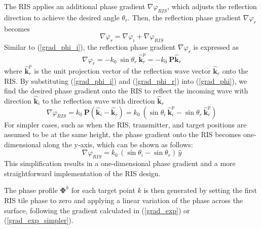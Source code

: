 \documentclass{IEEEoj}
\begin{document}
The RIS applies an additional phase gradient $\nabla \varphi_{RIS}$, which adjusts the reflection direction to achieve the desired angle $\theta_r$. Then, the reflection phase gradient $\nabla \varphi_r$ becomes
\begin{equation} \label{grad_phi}
	\nabla \varphi_r = \nabla \varphi_i + \nabla \varphi_{RIS}
\end{equation}
Similar to (\ref{grad_phi_i}), the reflection phase gradient $\nabla \varphi_r$ is expressed as
\begin{equation} \label{grad_phi_r}
	\nabla \varphi_r = - k_0 \ \sin\theta_r \ \mathbf{\hat{k}}_r^p = - k_0 \ \textbf{P} \mathbf{\hat{k}}_r
\end{equation}
where $\mathbf{\hat{k}}_r^p$ is the unit projection vector of the reflection wave vector \( \mathbf{\hat{k}}_r \) onto the RIS. By substituting (\ref{grad_phi_i}) and (\ref{grad_phi_r}) into (\ref{grad_phi}), we find the desired phase gradient onto the RIS to reflect the incoming wave with direction $\mathbf{\hat{k}}_i$ to the reflection wave with direction $\mathbf{\hat{k}}_r$
\begin{equation} \label{grad_exp}
	\nabla \varphi_{RIS} = k_0 \ \textbf{P} (\mathbf{\hat{k}}_i - \mathbf{\hat{k}}_r) = k_0 \ (\sin\theta_i \ \mathbf{\hat{k}}_i^p - \sin\theta_r \ \mathbf{\hat{k}}_r^p)
\end{equation}
For simpler cases, such as when the RIS, transmitter, and target positions are assumed to be at the same height, the phase gradient onto the RIS becomes one-dimensional along the y-axis, which can be shown as follows:
\begin{equation} \label{grad_exp_simpler}
	\nabla \varphi_{RIS} = k_0 \, (\sin\theta_i - \sin\theta_r) \, \hat{y}
\end{equation}
This simplification results in a one-dimensional phase gradient and a more straightforward implementation of the RIS design.

The phase profile $\mathbf{\Phi}^k$ for each target point $k$ is then generated by setting the first RIS tile phase to zero and applying a linear variation of the phase across the surface, following the gradient calculated in (\ref{grad_exp}) or (\ref{grad_exp_simpler}). 
\end{document}

